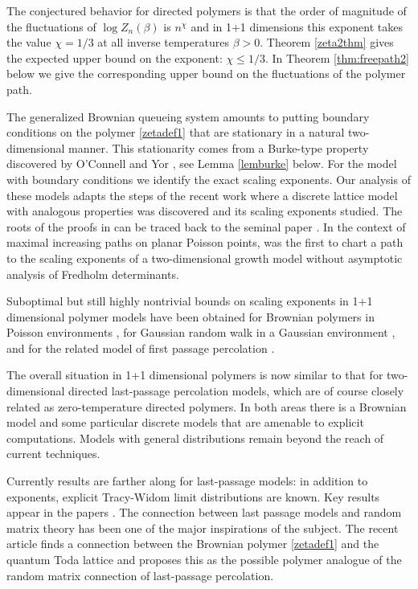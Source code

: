 \documentclass[11pt]{amsart}
\numberwithin{equation}{section}
\theoremstyle{remark}
\begin{document}
The conjectured behavior for directed polymers  is that the 
  order of magnitude of the  fluctuations of $\log{{Z}}_n(\beta)$ 
is  $n^\chi$ and in 1+1 dimensions this exponent takes the value 
 $\chi=1/3$  at all inverse temperatures $\beta>0$.  
Theorem \ref{zeta2thm} gives the expected  upper
bound on the exponent:  $\chi\le 1/3$.  In Theorem \ref{thm:freepath2} below
we give the corresponding upper bound on the fluctuations
of the polymer path.  

\medskip

 The generalized Brownian queueing system amounts
to putting boundary conditions on the polymer  \eqref{zetadef1}  that are stationary in a natural 
two-dimensional manner.   This stationarity comes from a 
  Burke-type  property  
discovered by O'Connell and  Yor   \cite{oconn-yor-01}, see Lemma \ref{lemburke} below. 
 For the  model with boundary conditions 
we identify the exact scaling exponents.  Our 
analysis of these models adapts  the steps of the recent work  \cite{sepp-poly} where a 
discrete lattice model with analogous properties was discovered and its 
scaling exponents studied.   The roots of the proofs in  \cite{sepp-poly}  can be traced back
to the seminal paper \cite{cato-groe-06}.  In the context of maximal increasing paths on planar
Poisson points, \cite{cato-groe-06}   was the first to chart a path to 
the scaling exponents  of a two-dimensional growth  model  without asymptotic
analysis of Fredholm determinants.  

 
 Suboptimal but still highly nontrivial  
bounds on scaling exponents in 1+1 dimensional polymer models have been obtained
for Brownian polymers in Poisson environments 
 \cite{come-yosh-05,wuth-98aihp,wuth-98aop}, 
 for  Gaussian random walk    in a Gaussian environment 
   \cite{meja-04,petermann},  and  for the related model of  first passage percolation 
\cite{lice-newm-piza,newm-piza}.  

The overall situation in 1+1 dimensional polymers is now similar to that 
for two-dimensional directed last-passage percolation models,
which are of course closely related as zero-temperature directed  polymers.  In both
areas  there is a Brownian model and some particular discrete models that are amenable 
to explicit computations. Models with general distributions remain  beyond the reach of current techniques. 

Currently results are farther along for last-passage models:
 in addition to exponents, explicit Tracy-Widom  limit distributions are known.  
  Key results   appear in the papers 
 \cite{baik-deif-joha-99, bala-cato-sepp, bary-01, cato-groe-06,
ferr-spoh-06,grav-trac-wido-01, joha, joha-ptrf-00}.
The connection between last passage models and random matrix theory has been one
of the major inspirations of the subject.  The recent article \cite{oconn-toda} finds 
a connection between the Brownian polymer  \eqref{zetadef1}  and the quantum Toda lattice and 
proposes this as the possible polymer analogue of the random matrix connection
of last-passage percolation.   
\end{document}
